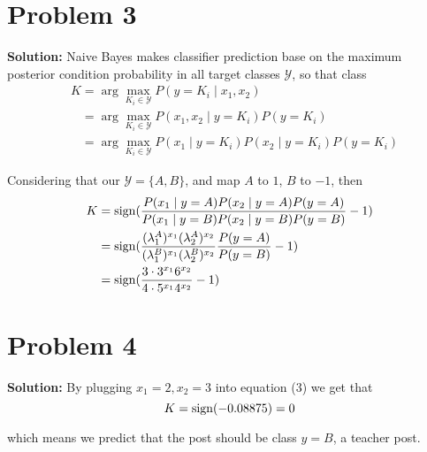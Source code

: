 \documentclass[11pt]{article}
\begin{document}
\section*{Problem 3}
\textbf{Solution:} 
	Naive Bayes makes classifier prediction base on the maximum posterior condition probability in all target classes $\mathcal{Y}$, so that class
	\begin{align}
		&K = \arg \max_{K_i \in \mathcal{Y}}P(y = K_i \mid x_1, x_2)\nonumber\\
		&\phantom{K} = \arg \max_{K_i \in \mathcal{Y}}P(x_1, x_2 \mid y = K_i)P(y = K_i)\nonumber\\
		&\phantom{K} = \arg \max_{K_i \in \mathcal{Y}}P(x_1 \mid y = K_i)P(x_2 \mid y = K_i)P(y = K_i)\nonumber
	\end{align}
	
	Considering that our $\mathcal{Y} = \{A, B\}$, and map $A$ to $1$, $B$ to $-1$, then
	\begin{align}
		&K = \mathop{\mathrm{sign}} (\frac{P(x_1 \mid y = A)P(x_2 \mid y = A)P(y = A)}{P(x_1 \mid y = B)P(x_2 \mid y = B)P(y = B)} - 1)\nonumber\\
		&\phantom{K} = \mathop{\mathrm{sign}} (\frac{(\lambda_1^A)^{x_1}(\lambda_2^A)^{x_2}}{(\lambda_1^B)^{x_1}(\lambda_2^B)^{x_2}}\frac{P(y = A)}{P(y = B)} - 1)\nonumber\\
		&\phantom{K} = \mathop{\mathrm{sign}} (\frac{3\cdot3^{x_1}6^{x_2}}{4\cdot5^{x_1}4^{x_2}} - 1)
	\end{align}
\section*{Problem 4}
\textbf{Solution:} By plugging $x_1 = 2, x_2 = 3$ into equation (3) we get that 
	\[K = \mathop{\mathrm{sign}}(-0.08875) = 0\]
	
	which means we predict that the post should be class $y = B$, a teacher post.

\newpage \nocite{*}


\end{document}
